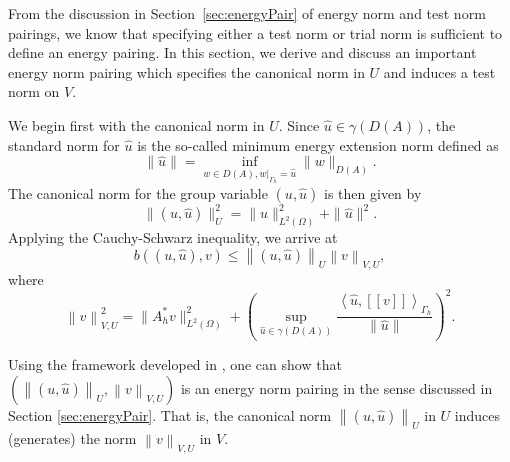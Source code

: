 \documentclass[11pt,onecolumn]{scrartcl}
\newcommand{\eqnlab}[1]{\label{eq:#1}}
\newcommand{\eqnref}[1]{\eqref{eq:#1}}
\newcommand{\secref}[1]{\ref{sec:#1}}
\newcommand{\nor}[1]{\left\| #1 \right\|}
\newcommand{\LRp}[1]{\left( #1 \right)}
\newcommand{\LRs}[1]{\left[ #1 \right]}
\newcommand{\LRa}[1]{\left\langle #1 \right\rangle}
\newcommand{\jump}[1] {\ensuremath{\LRs{\![#1]\!}}}
\newcommand{\uh}{\widehat{u}}
\renewcommand{\L}{L^2\LRp{\Omega}}
\newcommand{\Gh}{\Gamma_h}
\begin{document}
From the discussion in Section~\secref{energyPair} of energy norm and test norm pairings, we know that specifying either a test norm or trial norm is sufficient to define an energy pairing. %
In this section, we derive and discuss an important energy norm pairing which specifies the canonical norm in $U$ and induces a test norm on $V$. %

We begin first with the canonical norm in $U$. Since $\uh \in \gamma\LRp{D\LRp{A}}$, the standard norm for $\uh$ is
the so-called minimum energy extension norm defined as
\begin{equation}
\eqnlab{MEnorm}
\|\widehat{u}\| = \inf_{w\in D\LRp{A},
  \left.w\right|_{\Gh}=\widehat{u}} \|w\|_{D\LRp{A}}.
\end{equation}
The canonical norm for the group variable $\LRp{u,\uh}$ is then given by
\[
\|\left(u,\widehat{u}\right)\|_U^2 = \|u\|^2_{\L} + \|\widehat{u}\|^2.
\]
Applying the Cauchy-Schwarz inequality, we arrive at
\[
b\LRp{\LRp{u,\uh},v} \le \nor{\LRp{u,\uh}}_U \nor{v}_{V,U},
\]
where
\[
\nor{v}_{V,U}^2 = \|A_h^*v\|_{\L}^2
+\left(\sup_{\widehat{u} \in \gamma\LRp{D\LRp{A}}} \frac{\LRa{ \widehat{u},
  \jump{v} }_{\Gh}}{\|\widehat{u}\|}\right)^2.
\]


Using the framework developed in \cite{Bui-ThanhDemkowiczGhattas11a}, one can show that $\LRp{\nor{\LRp{u,\uh}}_U,  \nor{v}_{V,U}}$ is an energy norm pairing in the sense discussed in Section \secref{energyPair}. That is, the canonical norm $\nor{\LRp{u,\uh}}_U$ in $U$ induces (generates) the norm $\nor{v}_{V,U}$ in $V$.  
\end{document}
